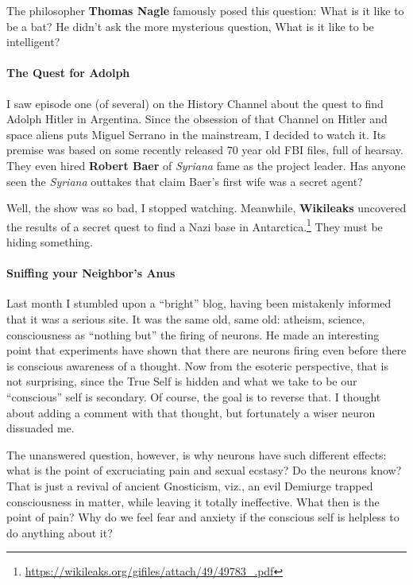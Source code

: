 The philosopher \textbf{Thomas Nagle} famously posed this question: What is it like to be a bat? He didn't ask the more mysterious question, What is it like to be intelligent?

\paragraph{The Quest for Adolph}


I saw episode one (of several) on the History Channel about the quest to find Adolph Hitler in Argentina. Since the obsession of that Channel on Hitler and space aliens puts Miguel Serrano in the mainstream, I decided to watch it. Its premise was based on some recently released 70 year old FBI files, full of hearsay. They even hired \textbf{Robert Baer} of \emph{Syriana} fame as the project leader. Has anyone seen the \emph{Syriana} outtakes that claim Baer's first wife was a secret agent?


Well, the show was so bad, I stopped watching. Meanwhile, \textbf{Wikileaks} uncovered the results of a secret quest to find a Nazi base in Antarctica.\footnote{\url{https://wikileaks.org/gifiles/attach/49/49783\_.pdf}} They must be hiding something.

\paragraph{Sniffing your Neighbor's Anus}


Last month I stumbled upon a ``bright'' blog, having been mistakenly informed that it was a serious site. It was the same old, same old: atheism, science, consciousness as ``nothing but'' the firing of neurons. He made an interesting point that experiments have shown that there are neurons firing even before there is conscious awareness of a thought. Now from the esoteric perspective, that is not surprising, since the True Self is hidden and what we take to be our ``conscious'' self is secondary. Of course, the goal is to reverse that. I thought about adding a comment with that thought, but fortunately a wiser neuron dissuaded me.

The unanswered question, however, is why neurons have such different effects: what is the point of excruciating pain and sexual ecstasy? Do the neurons know? That is just a revival of ancient Gnosticism, viz., an evil Demiurge trapped consciousness in matter, while leaving it totally ineffective. What then is the point of pain? Why do we feel fear and anxiety if the conscious self is helpless to do anything about it?

